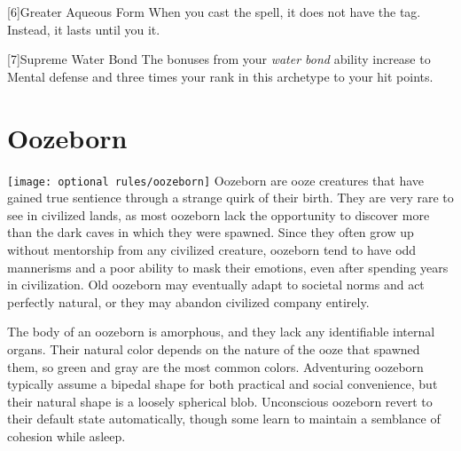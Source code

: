         [6]{Greater Aqueous Form} When you cast the  spell, it does not have the  tag.
        Instead, it lasts until you  it.

        [7]{Supreme Water Bond} The bonuses from your \textit{water bond} ability increase to  Mental defense and three times your rank in this archetype to your hit points.

\section{Oozeborn}
    \texttt{[image: optional rules/oozeborn]}
    Oozeborn are ooze creatures that have gained true sentience through a strange quirk of their birth.
    They are very rare to see in civilized lands, as most oozeborn lack the opportunity to discover more than the dark caves in which they were spawned.
    Since they often grow up without mentorship from any civilized creature, oozeborn tend to have odd mannerisms and a poor ability to mask their emotions, even after spending years in civilization.
    Old oozeborn may eventually adapt to societal norms and act perfectly natural, or they may abandon civilized company entirely.

    The body of an oozeborn is amorphous, and they lack any identifiable internal organs.
    Their natural color depends on the nature of the ooze that spawned them, so green and gray are the most common colors.
    Adventuring oozeborn typically assume a bipedal shape for both practical and social convenience, but their natural shape is a loosely spherical blob.
    Unconscious oozeborn revert to their default state automatically, though some learn to maintain a semblance of cohesion while asleep.

